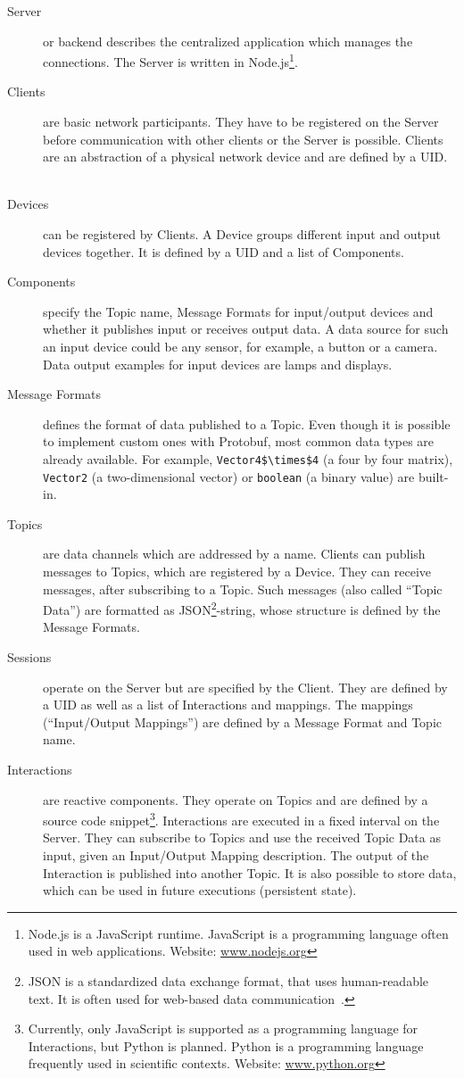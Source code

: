 \begin{description}
 \item[Server] or backend describes the centralized application which manages the connections. The Server is written in Node.js\footnote{Node.js is a JavaScript runtime. JavaScript is a programming language often used in web applications. Website: \href{https://nodejs.org/}{www.nodejs.org}}.
  \item[Clients] are basic network participants. They have to be registered on the Server before communication with other clients or the Server is possible. Clients are an abstraction of a physical network device and are defined by a \ac{UID}. 
  \item[Devices] can be registered by Clients. A Device groups different input and output devices together. It is defined by a \ac{UID} and a list of Components.
 \item[Components] specify the Topic name, Message Formats for input/output devices and whether it publishes input or receives output data. A data source for such an input device could be any sensor, for example, a button or a camera. Data output examples for input devices are lamps and displays.
 \item[Message Formats] defines the format of data published to a Topic. Even though it is possible to implement custom ones with \ac{Protobuf}, most common data types are already available. For example, \lstinline[mathescape=true]{Vector4$\times$4} (a four by four matrix), \lstinline{Vector2} (a two-dimensional vector) or \lstinline{boolean} (a binary value) are built-in. %
  \item[Topics] are data channels which are addressed by a name. Clients can publish messages to Topics, which are registered by a Device. They can receive messages, after subscribing to a Topic. Such messages (also called \enquote{Topic Data}) are formatted as JSON\footnote{JSON is a standardized data exchange format, that uses human-readable text. It is often used for web-based data communication~\cite[iii]{ECMAInternational.2017}.}-string, whose structure is defined by the Message Formats.
  \item[Sessions] operate on the Server but are specified by the Client. They are defined by a \ac{UID} as well as a list of Interactions and mappings. The mappings (\enquote{Input/Output Mappings}) are defined by a Message Format and Topic name.
  \item[Interactions] are reactive components. They operate on Topics and are defined by a source code snippet\footnote{Currently, only JavaScript is supported as a programming language for Interactions, but Python is planned. Python is a programming language frequently used in scientific contexts. Website: \href{https://www.python.org/}{www.python.org}}. Interactions are executed in a fixed interval on the Server. They can subscribe to Topics and use the received Topic Data as input, given an Input/Output Mapping description. The output of the Interaction is published into another Topic. It is also possible to store data, which can be used in future executions (persistent state).

\end{description}
